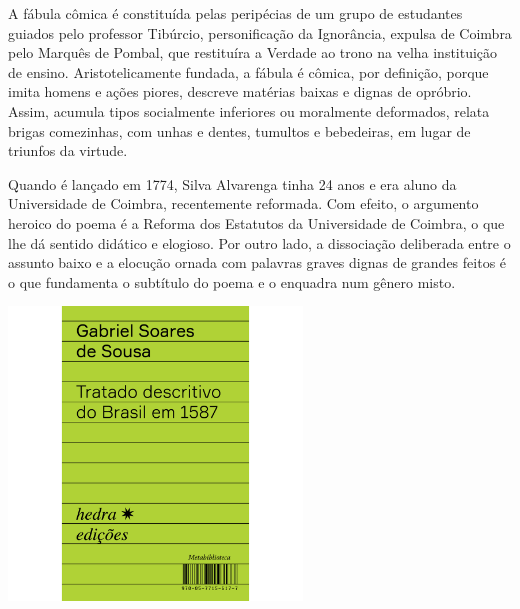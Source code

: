 \medskip

\noindent{}A fábula cômica é constituída pelas peripécias de um grupo de estudantes guiados pelo professor Tibúrcio, personificação da Ignorância, expulsa de Coimbra pelo Marquês de Pombal, que restituíra a Verdade ao trono na velha instituição de ensino. Aristotelicamente fundada, a fábula é cômica, por definição, porque imita homens e ações piores, descreve matérias baixas e dignas de opróbrio. Assim, acumula tipos socialmente inferiores ou moralmente deformados, relata brigas comezinhas, com unhas e dentes, tumultos e bebedeiras, em lugar de triunfos da virtude.

Quando {} é lançado em 1774, Silva Alvarenga tinha 24 anos e era aluno da Universidade de Coimbra, recentemente reformada. Com efeito, o argumento heroico do poema é a Reforma dos Estatutos da Universidade de Coimbra, o que lhe dá sentido didático e elogioso. Por outro lado, a dissociação deliberada entre o assunto baixo e a elocução ornada com palavras graves dignas de grandes feitos é o que fundamenta o subtítulo do poema e o enquadra num gênero misto.

\vfill

\hspace*{-.4cm}\begin{minipage}[c]{.5\linewidth}
\small{
{}}
\end{minipage}

\pagebreak

\begin{center}
\hspace*{.5cm}\includegraphics[width=78mm]{./grid/tratado.png}
\end{center}

